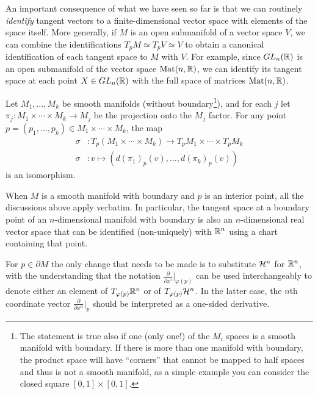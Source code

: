 An important consequence of what we have seen so far is that we can routinely \emph{identify} tangent vectors to a finite-dimensional vector space with elements of the space itself.
More generally, if $M$ is an open submanifold of a vector space $V$, we can combine the identifications $T_p M \simeq T_p V \simeq V$ to obtain a canonical identification of each tangent space to $M$ with $V$.
For example, since $GL_n(\mathbb{R})$ is an open submanifold of the vector space $\mathrm{Mat}(n, \mathbb{R})$, we can identify its tangent space at each point $X\in GL_n(\mathbb{R})$ with the full space of matrices $\mathrm{Mat}(n, \mathbb{R})$.

\begin{exercise}
  Let $M_1, \ldots, M_k$ be smooth manifolds (without boundary\footnote{The statement is true also if one (only one!) of the $M_i$ spaces is a smooth manifold with boundary. If there is more than one manifold with boundary, the product space will have ``corners'' that cannot be mapped to half spaces and thus is not a smooth manifold, as a simple example you can consider the closed square $[0,1]\times [0,1]$.}), and for each $j$ let $\pi_j:M_1\times\cdots\times M_k \to M_j$ be the projection onto the $M_j$ factor.
  For any point $p=(p_1,\ldots,p_k)\in M_1\times\cdots\times M_k$, the map
  \begin{align}
    \sigma & : T_p(M_1\times\cdots\times M_k) \to T_p M_1\times\cdots\times T_p M_k \\
    \sigma & : v \mapsto \left(d(\pi_1)_p(v), \ldots, d(\pi_k)_p(v)\right)
  \end{align}
  is an isomorphism.
\end{exercise}

\begin{remark}
  When $M$ is a smooth manifold with boundary and $p$ is an interior point, all the discussions above apply verbatim. In particular, the tangent space at a boundary point of an $n$-dimensional manifold with boundary is also an $n$-dimensional real vector space that can be identified (non-uniquely) with $\mathbb{R}^n$ using a chart containing that point.

  For $p\in\partial M$ the only change that needs to be made is to substitute $\mathcal{H}^n$ for $\mathbb{R}^n$, with the understanding that the notation $\frac{\partial}{\partial x^i}\big|_{\varphi(p)}$ can be used interchangeably to denote either an element of $T_{\varphi(p)}\mathbb{R}^n$ or of $T_{\varphi(p)}\mathcal{H}^n$. In the latter case, the $n$th coordinate vector $\frac{\partial}{\partial x^n}\big|_{p}$ should be interpreted as a one-sided derivative.
\end{remark}

